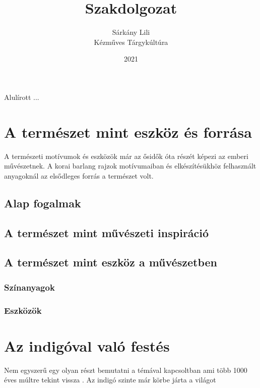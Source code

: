 \documentclass[fontsize=12pt, appendixprefix=true]{scrreprt}
\author{Sárkány Lili\\Kézműves Tárgykúltúra}
\title{Szakdolgozat}
\date{2021}
\newcommand{\pushtobottom}{\vspace*{\fill}}
\newcommand{\signatureline}[1]{\begin{flushright}
	\vspace*{.5cm}\par\noindent\makebox[2.5in]{\hrulefill}
	\par\noindent\makebox[2.5in][c]{#1}
	\end{flushright}
}
\begin{document}
\maketitle

Alulírott ...
\pushtobottom
\signatureline{Aláírás}

\tableofcontents
%

\chapter{A természet mint eszköz és forrása}
A természeti motívumok és eszközök már az ősidők óta részét képezi az emberi művészetnek. \cite{domonkos1981magyarorszagi} A korai barlang rajzok motívumaiban és elkészítésükhöz felhasznált \cite{tiborindigokemia} anyagoknál az elsődleges forrás a természet volt.
\section{Alap fogalmak}
\section{A természet mint művészeti inspiráció}
\section{A természet mint eszköz a művészetben}
\subsection{Színanyagok}
\subsection{Eszközök}

\chapter{Az indigóval való festés}
Nem egyszerű egy olyan részt bemutatni a témával kapcsoltban ami több 1000 éves múltre tekint vissza .
Az indigó szinte már körbe járta a világot 
\end{document}
